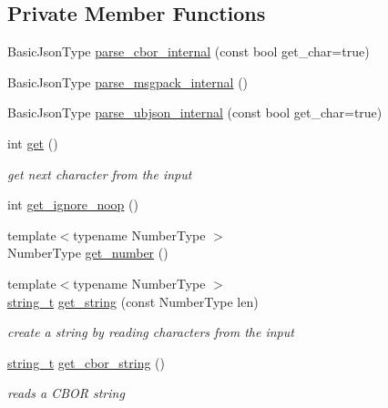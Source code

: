 \subsection*{Private Member Functions}
\begin{DoxyCompactItemize}
\item 
Basic\+Json\+Type \hyperlink{classnlohmann_1_1detail_1_1binary__reader_a0d919ee892fbbeedb27ff95c4e4010e1}{parse\+\_\+cbor\+\_\+internal} (const bool get\+\_\+char=true)
\item 
Basic\+Json\+Type \hyperlink{classnlohmann_1_1detail_1_1binary__reader_ac6dc6270ddddd0aac65fe6cab53d7cc2}{parse\+\_\+msgpack\+\_\+internal} ()
\item 
Basic\+Json\+Type \hyperlink{classnlohmann_1_1detail_1_1binary__reader_a439e369278be4412b05f3481c226eafa}{parse\+\_\+ubjson\+\_\+internal} (const bool get\+\_\+char=true)
\item 
int \hyperlink{classnlohmann_1_1detail_1_1binary__reader_a715bbe54c5066921fcb72f0067871a72}{get} ()
\begin{DoxyCompactList}\small\item\em get next character from the input \end{DoxyCompactList}\item 
int \hyperlink{classnlohmann_1_1detail_1_1binary__reader_a372a4b61f0c57f3d4f1e9484a416a3cd}{get\+\_\+ignore\+\_\+noop} ()
\item 
{\footnotesize template$<$typename Number\+Type $>$ }\\Number\+Type \hyperlink{classnlohmann_1_1detail_1_1binary__reader_a3e87e5b33764fc085bfce41d64247279}{get\+\_\+number} ()
\item 
{\footnotesize template$<$typename Number\+Type $>$ }\\\hyperlink{classnlohmann_1_1detail_1_1binary__reader_a889a8702ca8aa45e99136bc31ea898e9}{string\+\_\+t} \hyperlink{classnlohmann_1_1detail_1_1binary__reader_a195b573a807da6d5841a898c6f74e03c}{get\+\_\+string} (const Number\+Type len)
\begin{DoxyCompactList}\small\item\em create a string by reading characters from the input \end{DoxyCompactList}\item 
\hyperlink{classnlohmann_1_1detail_1_1binary__reader_a889a8702ca8aa45e99136bc31ea898e9}{string\+\_\+t} \hyperlink{classnlohmann_1_1detail_1_1binary__reader_ac626ec37d1724d9d36d918c6361f8e57}{get\+\_\+cbor\+\_\+string} ()
\begin{DoxyCompactList}\small\item\em reads a C\+B\+OR string \end{DoxyCompactList}\item 

\end{DoxyCompactItemize}
